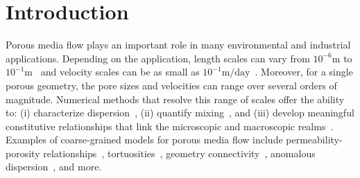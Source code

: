 \documentclass{jfm}
\begin{document}
\begin{abstract}
\end{abstract}



\section{Introduction}
\label{sec:intro}
Porous media flow plays an important role in many environmental and
industrial applications.  Depending on the application, length scales
can vary from $10^{-6}\mathrm{m}$ to
$10^{-1}\mathrm{m}$~\citep{mil-chr-imh-mcb-ped1998} and velocity scales
can be as small as $10^{-1}\mathrm{m/day}$~\citep{kut-scr-dav-ham1995}.
Moreover, for a single porous geometry, the pore sizes and velocities
can range over several orders of magnitude.  Numerical methods that
resolve this range of scales offer the ability to: (i) characterize
dispersion~\citep{saf1959}, (ii) quantify
mixing~\citep{leb-den-dav-bol-car-dec-bou2011, den-leb-eng-bij2011}, and
(iii) develop meaningful constitutive relationships that link the
microscopic and macroscopic realms~\citep{mil-chr-imh-mcb-ped1998}.
Examples of coarse-grained models for porous media flow include
permeability-porosity relationships~\citep{dar-mcc1998, car1937},
tortuosities~\citep{mat-kha-koz2008, dud-koz-mat2011, kop-kat-tim1996},
geometry connectivity~\citep{knu-car2005}, anomalous
dispersion~\citep{den-cor-sch-ber2004}, and more.  
\end{document}
